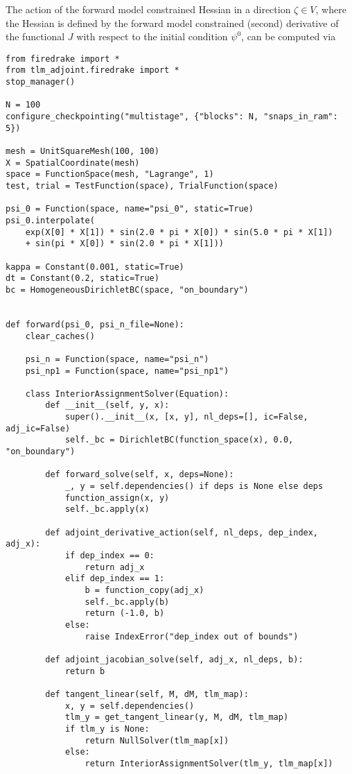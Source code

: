 \documentclass[11pt]{article}
\begin{document}
The action of the forward model constrained Hessian in a direction $\zeta \in
V$, where the Hessian is defined by the forward model constrained (second)
derivative of the functional $J$ with respect to the initial condition
$\psi^0$, can be computed via
\begin{lstlisting}
from firedrake import *
from tlm_adjoint.firedrake import *
stop_manager()

N = 100
configure_checkpointing("multistage", {"blocks": N, "snaps_in_ram": 5})

mesh = UnitSquareMesh(100, 100)
X = SpatialCoordinate(mesh)
space = FunctionSpace(mesh, "Lagrange", 1)
test, trial = TestFunction(space), TrialFunction(space)

psi_0 = Function(space, name="psi_0", static=True)
psi_0.interpolate(
    exp(X[0] * X[1]) * sin(2.0 * pi * X[0]) * sin(5.0 * pi * X[1])
    + sin(pi * X[0]) * sin(2.0 * pi * X[1]))

kappa = Constant(0.001, static=True)
dt = Constant(0.2, static=True)
bc = HomogeneousDirichletBC(space, "on_boundary")


def forward(psi_0, psi_n_file=None):
    clear_caches()

    psi_n = Function(space, name="psi_n")
    psi_np1 = Function(space, name="psi_np1")

    class InteriorAssignmentSolver(Equation):
        def __init__(self, y, x):
            super().__init__(x, [x, y], nl_deps=[], ic=False, adj_ic=False)
            self._bc = DirichletBC(function_space(x), 0.0, "on_boundary")

        def forward_solve(self, x, deps=None):
            _, y = self.dependencies() if deps is None else deps
            function_assign(x, y)
            self._bc.apply(x)

        def adjoint_derivative_action(self, nl_deps, dep_index, adj_x):
            if dep_index == 0:
                return adj_x
            elif dep_index == 1:
                b = function_copy(adj_x)
                self._bc.apply(b)
                return (-1.0, b)
            else:
                raise IndexError("dep_index out of bounds")

        def adjoint_jacobian_solve(self, adj_x, nl_deps, b):
            return b

        def tangent_linear(self, M, dM, tlm_map):
            x, y = self.dependencies()
            tlm_y = get_tangent_linear(y, M, dM, tlm_map)
            if tlm_y is None:
                return NullSolver(tlm_map[x])
            else:
                return InteriorAssignmentSolver(tlm_y, tlm_map[x])


\end{lstlisting}
\end{document}
